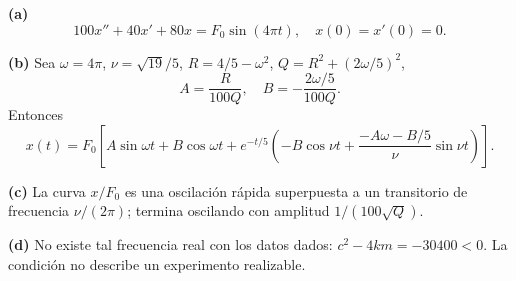 \noindent\textbf{(a)} \[100x''+40x'+80x=F_0\sin(4\pi t),\quad x(0)=x'(0)=0.\]

\noindent\textbf{(b)} Sea \(\omega=4\pi\), \(\nu=\sqrt{19}/5\), \(R=4/5-\omega^2\), \(Q=R^2+(2\omega/5)^2\),
\[A=\frac{R}{100Q},\quad B=-\frac{2\omega/5}{100Q}.\]
Entonces
\[x(t)=F_0\left[A\sin\omega t+B\cos\omega t+e^{-t/5}\left(-B\cos\nu t+\frac{-A\omega-B/5}{\nu}\sin\nu t\right)\right].\]

\noindent\textbf{(c)} La curva \(x/F_0\) es una oscilación rápida superpuesta a un transitorio de frecuencia \(\nu/(2\pi)\); termina oscilando con amplitud \(1/(100\sqrt Q)\).

\noindent\textbf{(d)} No existe tal frecuencia real con los datos dados: \(c^2-4km=-30400<0\). La condición no describe un experimento realizable.
